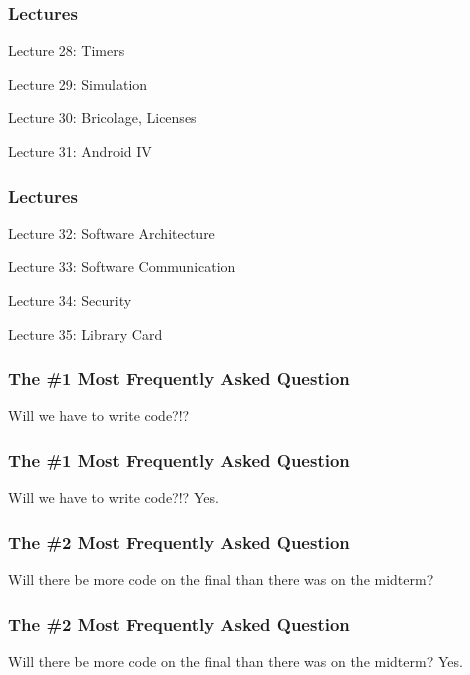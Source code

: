 \begin{frame}
\frametitle{Lectures}
{\LARGE

Lecture 28: Timers

Lecture 29: Simulation

Lecture 30: Bricolage, Licenses

Lecture 31: Android IV
}

\end{frame}

\begin{frame}
\frametitle{Lectures}
{\LARGE

Lecture 32: Software Architecture

Lecture 33: Software Communication

Lecture 34: Security

Lecture 35: Library Card
}

\end{frame}



\begin{frame}
\frametitle{The \#1 Most Frequently Asked Question}

{\LARGE
Will we have to write code?!?
}

\end{frame}

\begin{frame}
\frametitle{The \#1 Most Frequently Asked Question}

{\LARGE
Will we have to write code?!? \alert{Yes.}
}

\end{frame}

\begin{frame}
\frametitle{The \#2 Most Frequently Asked Question}

{\LARGE
Will there be more code on the final than there was on the midterm?
}

\end{frame}

\begin{frame}
\frametitle{The \#2 Most Frequently Asked Question}

{\LARGE
Will there be more code on the final than there was on the midterm? \alert{Yes.}
}

\end{frame}


